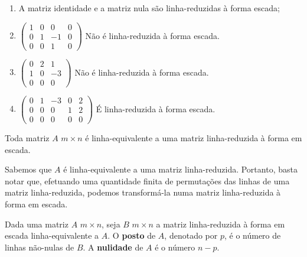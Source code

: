 \begin{exemplo}
\begin{enumerate}
	\item  A matriz identidade e a matriz nula s\~ao linha-reduzidas \`a forma escada;
	\item $\begin{pmatrix}
	1 & 0 & 0 & 0\\
	0 & 1 & -1 & 0\\
	0 & 0 & 1 & 0
	\end{pmatrix}$ N\~ao \'e linha-reduzida \`a forma escada.
	\item $\begin{pmatrix}
	0 & 2 & 1\\
	1 & 0 & -3\\
	0 & 0 & 0
	\end{pmatrix}$ N\~ao \'e linha-reduzida \`a forma escada.
	\item $\begin{pmatrix}
	0 & 1 & -3 & 0 & 2\\
	0 & 0 & 0 & 1 & 2\\
	0 & 0 & 0 & 0 & 0
	\end{pmatrix}$ \'E linha-reduzida \`a forma escada.
\end{enumerate}
\end{exemplo}

\begin{teorema}
Toda matriz $A$ $m \times n$ \'e linha-equivalente a uma matriz linha-reduzida \`a forma em escada.
\end{teorema}
\begin{prova}
Sabemos que $A$ \'e linha-equivalente a uma matriz linha-reduzida. Portanto, basta notar que, efetuando uma quantidade finita de permuta\c{c}\~oes das linhas de uma matriz linha-reduzida, podemos transform\'a-la numa matriz linha-reduzida \`a forma em escada.
\end{prova}

\begin{definicao}
Dada uma matriz $A$ $m \times n$, seja $B$ $m \times n$ a matriz linha-reduzida \`a forma em escada linha-equivalente a $A$. O \textbf{posto} de $A$, denotado por $p$, \'e o n\'umero de linhas n\~ao-nulas de $B$. A \textbf{nulidade} de $A$ \'e o n\'umero $n - p$.
\end{definicao}

